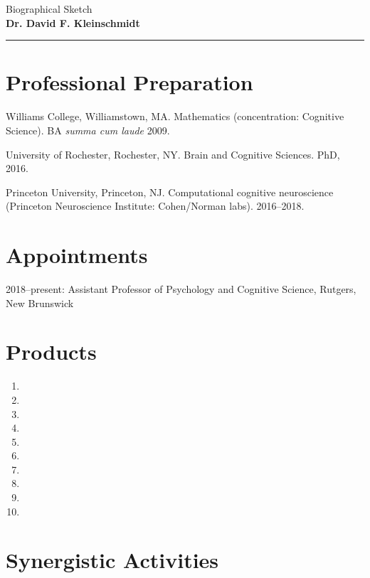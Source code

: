 \documentclass[11pt]{article}
\begin{document}
Biographical Sketch\\
{\Large\bfseries Dr. David F. Kleinschmidt}

\vspace{0.5\baselineskip}
\hrule

\section{Professional Preparation}

Williams College, Williamstown, MA. Mathematics (concentration: Cognitive
Science).  BA \emph{summa cum laude} 2009.

University of Rochester, Rochester, NY. Brain and Cognitive Sciences. PhD, 2016.

Princeton University, Princeton, NJ. Computational cognitive neuroscience
(Princeton Neuroscience Institute: Cohen/Norman labs). 2016--2018.


\section{Appointments}

2018--present: Assistant Professor of Psychology and Cognitive Science,
  Rutgers, New Brunswick

\section{Products}

\begin{enumerate}
  \item {}
  \item {}
  \item {}
  \item {}
  \item {}
  \item {}
  \item {}
  \item {}
  \item {}
  \item {}
\end{enumerate}  

\section{Synergistic Activities}
\end{document}
